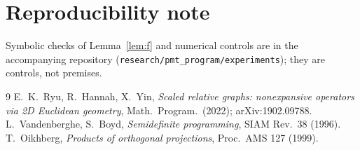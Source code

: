 \documentclass[11pt]{amsart}
\theoremstyle{definition}
\begin{document}
\section*{Reproducibility note}
Symbolic checks of Lemma~\ref{lem:f} and numerical controls are in the accompanying repository
(\texttt{research/pmt\_program/experiments}); they are controls, not premises.

\begin{thebibliography}{9}
 E.~K.~Ryu, R.~Hannah, X.~Yin, \emph{Scaled relative graphs: nonexpansive operators via 2D Euclidean geometry}, Math.\ Program.\ (2022); arXiv:1902.09788.
 L.~Vandenberghe, S.~Boyd, \emph{Semidefinite programming}, SIAM Rev.\ 38 (1996).
 T.~Oikhberg, \emph{Products of orthogonal projections}, Proc.\ AMS 127 (1999).
\end{thebibliography}
\end{document}

